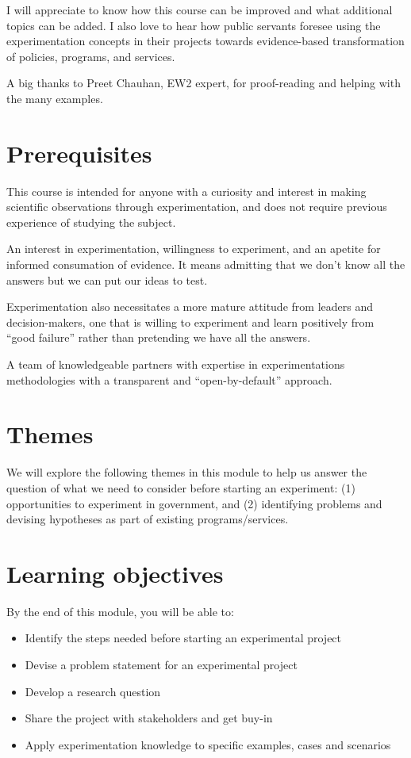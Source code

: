 \documentclass[openany]{book}
\providecommand{\tightlist}{%
  \setlength{\itemsep}{0pt}\setlength{\parskip}{0pt}}
\begin{document}
I will appreciate to know how this course can be improved and what additional topics can be added. I also love to hear how public servants foresee using the experimentation concepts in their projects towards evidence-based transformation of policies, programs, and services.

A big thanks to Preet Chauhan, EW2 expert, for proof-reading and helping with the many examples.

\hypertarget{prerequisites}{%
\section{Prerequisites}\label{prerequisites}}

This course is intended for anyone with a curiosity and interest in making scientific observations through experimentation, and does not require previous experience of studying the subject.

An interest in experimentation, willingness to experiment, and an apetite for informed consumation of evidence. It means admitting that we don't know all the answers but we can put our ideas to test.

Experimentation also necessitates a more mature attitude from leaders and decision-makers, one that is willing to experiment and learn positively from ``good failure'' rather than pretending we have all the answers.

A team of knowledgeable partners with expertise in experimentations methodologies with a transparent and ``open-by-default'' approach.

\hypertarget{themes}{%
\section{Themes}\label{themes}}

We will explore the following themes in this module to help us answer the question of what we need to consider before starting an experiment: (1) opportunities to experiment in government, and (2) identifying problems and devising hypotheses as part of existing programs/services.

\hypertarget{learning-objectives}{%
\section{Learning objectives}\label{learning-objectives}}

By the end of this module, you will be able to:

\begin{itemize}
\tightlist
\item
  Identify the steps needed before starting an experimental project
\item
  Devise a problem statement for an experimental project
\item
  Develop a research question
\item
  Share the project with stakeholders and get buy-in
\item
  Apply experimentation knowledge to specific examples, cases and scenarios
\end{itemize}
\end{document}
